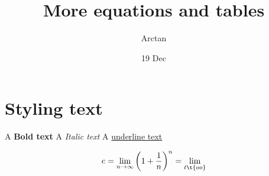 \documentclass{article}
\title{More equations and tables}
\author{Arctan}
\date{19 Dec}
\begin{document}
\maketitle

\section{Styling text}

A \textbf{Bold text}
A \textit{Italic text}
A \underline{underline text}

    \begin{equation}
        e = \lim_{n\to\infty}\left(1+\frac{1}{n}\right)^n
          = \lim_{t\t{oo}}
    \end{equation}
\end{document}
